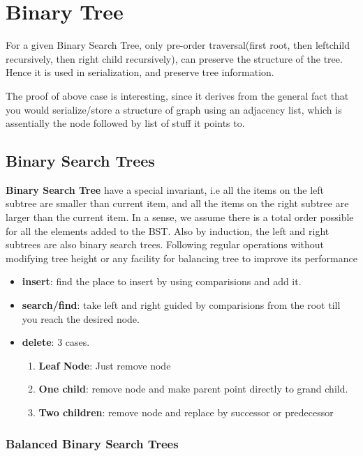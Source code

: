 \documentclass[10pt,a4paper]{article}
\begin{document}
	\section{Binary Tree}
	
	For a given Binary Search Tree, only pre-order traversal(first root, then leftchild recursively, then right child recursively), can preserve the structure of the tree. Hence it is used in serialization, and preserve tree information.
	
	The proof of above case is interesting, since it derives from the general fact that you would serialize/store a structure of graph using an adjacency list, which is assentially the node followed by list of stuff it points to.
	
	\subsection{Binary Search Trees}
	
	\textbf{Binary Search Tree} have a special invariant, i.e all the items on the left subtree are smaller than current item, and all the items on the right subtree are larger than the current item. In a sense, we assume there is a total order possible for all the elements added to the BST. Also by induction, the left and right subtrees are also binary search trees.
	Following regular operations without modifying tree height or any facility for balancing tree to improve its performance
	\begin{itemize}
		\item \textbf{insert}: find the place to insert by using comparisions and add it.
		\item \textbf{search/find}: take left and right guided by comparisions from the root till you reach the desired node.
		\item \textbf{delete}: 3 cases.
		  \begin{enumerate}
			\item \textbf{Leaf Node}: Just remove node
			\item \textbf{One child}: remove node and make parent point directly to grand child.
			\item \textbf{Two children}: remove node and replace by successor or predecessor
		\end{enumerate}
		
	\end{itemize}

	\subsubsection{Balanced Binary Search Trees}
	
\end{document}
